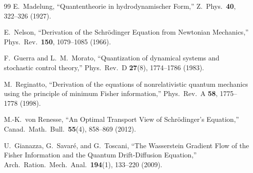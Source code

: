 \documentclass[11pt]{article}
\begin{document}
\begin{thebibliography}{99}
 E.~Madelung, ``Quantentheorie in hydrodynamischer Form,'' Z.\ Phys.\ \textbf{40}, 322--326 (1927).

 E.~Nelson, ``Derivation of the Schr\"odinger Equation from Newtonian Mechanics,'' Phys.\ Rev.\ \textbf{150}, 1079--1085 (1966).

 F.~Guerra and L.~M.~Morato, ``Quantization of dynamical systems and stochastic control theory,'' Phys.\ Rev.\ D \textbf{27}(8), 1774--1786 (1983).

 M.~Reginatto, ``Derivation of the equations of nonrelativistic quantum mechanics using the principle of minimum Fisher information,'' Phys.\ Rev.\ A \textbf{58}, 1775--1778 (1998).

 M.-K.~von Renesse, ``An Optimal Transport View of Schr\"odinger's Equation,'' Canad.\ Math.\ Bull.\ \textbf{55}(4), 858--869 (2012).

 U.~Gianazza, G.~Savar\'e, and G.~Toscani, ``The Wasserstein Gradient Flow of the Fisher Information and the Quantum Drift-Diffusion Equation,'' Arch.\ Ration.\ Mech.\ Anal.\ \textbf{194}(1), 133--220 (2009).

\end{thebibliography}
\end{document}
